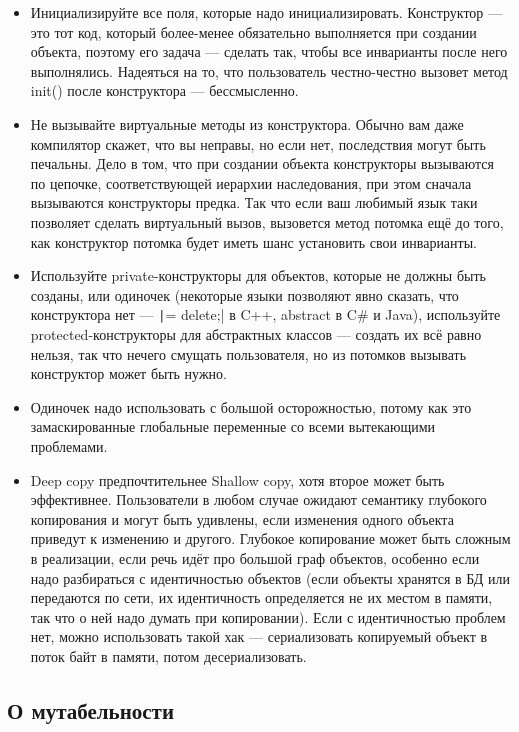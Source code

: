 \documentclass[a5paper]{article}
\begin{document}
\begin{itemize}
	\item Инициализируйте все поля, которые надо инициализировать. Конструктор --- это тот код, который более-менее обязательно выполняется при создании объекта, поэтому его задача --- сделать так, чтобы все инварианты после него выполнялись. Надеяться на то, что пользователь честно-честно вызовет метод init() после конструктора --- бессмысленно.
	\item Не вызывайте виртуальные методы из конструктора. Обычно вам даже компилятор скажет, что вы неправы, но если нет, последствия могут быть печальны. Дело в том, что при создании объекта конструкторы вызываются по цепочке, соответствующей иерархии наследования, при этом сначала вызываются конструкторы предка. Так что если ваш любимый язык таки позволяет сделать виртуальный вызов, вызовется метод потомка ещё до того, как конструктор потомка будет иметь шанс установить свои инварианты.
	\item Используйте private-конструкторы для объектов, которые не должны быть созданы, или одиночек (некоторые языки позволяют явно сказать, что конструктора нет --- \texttt|= delete;| в C++, abstract в C\# и Java), используйте protected-конструкторы для абстрактных классов --- создать их всё равно нельзя, так что нечего смущать пользователя, но из потомков вызывать конструктор может быть нужно.
	\item Одиночек надо использовать с большой осторожностью, потому как это замаскированные глобальные переменные со всеми вытекающими проблемами.
	\item Deep copy предпочтительнее Shallow copy, хотя второе может быть эффективнее. Пользователи в любом случае ожидают семантику глубокого копирования и могут быть удивлены, если изменения одного объекта приведут к изменению и другого. Глубокое копирование может быть сложным в реализации, если речь идёт про большой граф объектов, особенно если надо разбираться с идентичностью объектов (если объекты хранятся в БД или передаются по сети, их идентичность определяется не их местом в памяти, так что о ней надо думать при копировании). Если с идентичностью проблем нет, можно использовать такой хак --- сериализовать копируемый объект в поток байт в памяти, потом десериализовать.
\end{itemize}

\subsection{О мутабельности}
\end{document}
